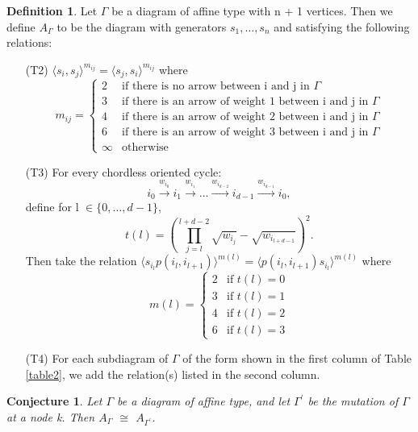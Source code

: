 \documentclass[11pt]{amsart}
\newtheorem{conj}[thm]{Conjecture}
\theoremstyle{definition}
\newtheorem{defn}[thm]{Definition}
\begin{document}
\begin{defn}
Let $\Gamma$ be a diagram of affine type with n + 1 vertices. Then we define $A_{\Gamma}$ to be the diagram with generators $s_{1}, \dots, s_{n}$ and satisfying the following relations:
\begin{enumerate}
\item[(T2)] $\langle s_{i}, s_{j} \rangle^{m_{ij}} = \langle s_{j}, s_{i} \rangle^{m_{ij}}$ where
$$m_{ij} = 
\begin{cases}
2 &\text{if there is no arrow between i and j in $\Gamma$} \\
3 &\text{if there is an arrow of weight 1 between i and j in $\Gamma$} \\
4 &\text{if there is an arrow of weight 2 between i and j in $\Gamma$} \\
6 &\text{if there is an arrow of weight 3 between i and j in $\Gamma$} \\
\infty &\text{otherwise}
\end{cases}$$
\item[(T3)] For every chordless oriented cycle:
$$i_{0} \stackrel{w_{i_{0}}}{\longrightarrow} i_{1} \stackrel{w_{i_{1}}}{\longrightarrow} \dots \stackrel{w_{i_{d-2}}}{\longrightarrow} i_{d-1} \stackrel{w_{i_{d-1}}}{\longrightarrow} i_{0},$$
define for l $\in \{0, \dots, d-1\}$, 
$$t(l) = (\prod_{j=l}^{l+d-2}{\sqrt{w_{i_{j}}}} - \sqrt{w_{i_{l+d-1}}})^{2}.$$
Then take the relation $\langle s_{i_{l}}p(i_{l}, i_{l+1}) \rangle^{m(l)} = \langle p(i_{l}, i_{l+1})s_{i_{l}} \rangle^{m(l)}$ where
$$m(l) =
\begin{cases}
2 &\text{if $t(l)=0$} \\
3 &\text{if $t(l)=1$} \\
4 &\text{if $t(l)=2$} \\
6 &\text{if $t(l)=3$}
\end{cases}$$
\item[(T4)] For each subdiagram of $\Gamma$ of the form shown in the first column of Table \ref{table2}, we add the relation(s) listed in the second column.
\end{enumerate}
\end{defn}

\begin{conj}
Let $\Gamma$ be a diagram of affine type, and let $\Gamma^{\prime}$ be the mutation of $\Gamma$ at a node k. Then $A_{\Gamma}$ $\cong$ $A_{\Gamma^{\prime}}$.
\end{conj}
\end{document}
